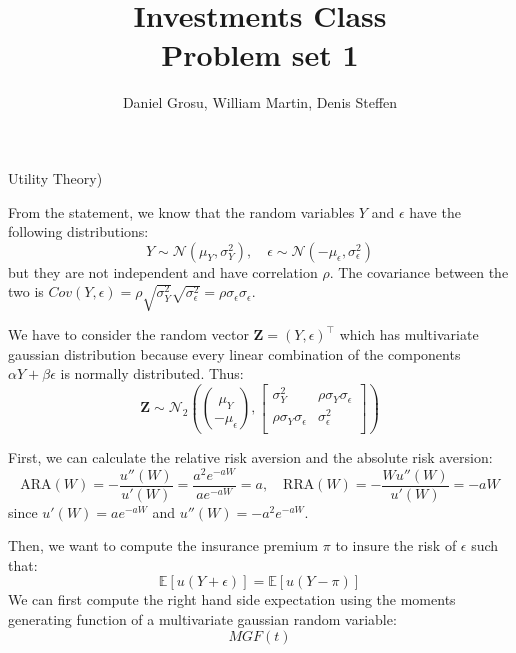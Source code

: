 \documentclass[10pt]{article}
\newcommand{\Ebb}{\mathbb{E}}
\renewcommand{\mathbf}{\mathbold}
\newenvironment{exercise}[2][Exercise]{\begin{trivlist}
  \item[\hskip \labelsep {\bfseries #1}\hskip \labelsep {\bfseries #2.}]}{\end{trivlist}}
\begin{document}
	
  \renewcommand{\qedsymbol}{\smiley}
	\title{Investments Class \\ Problem set 1}
	\author{Daniel Grosu, William Martin, Denis Steffen}
	
	\maketitle

  \begin{exercise}{1}(Utility Theory)

From the statement, we know that the random variables $Y$ and $\epsilon$ have the following distributions:
$$ Y \sim \mathcal{N}(\mu_Y,\sigma_Y^2), \quad \epsilon \sim \mathcal{N}(-\mu_\epsilon,\sigma_\epsilon^2)$$ but they are not independent and have correlation $\rho$. 
The covariance between the two is $Cov(Y,\epsilon) = \rho\sqrt{\sigma_Y^2}\sqrt{\sigma_\epsilon^2} = \rho\sigma_\epsilon\sigma_\epsilon$. 

We have to consider the random vector $\mathbf{Z} = (Y,\epsilon)^\top$ which has multivariate gaussian distribution because every linear combination of the components $\alpha Y + \beta \epsilon$ is normally distributed. Thus:
$$ \mathbf{Z} \sim \mathcal{N}_2 \left( {\mu_Y \choose -\mu_\epsilon},\begin{bmatrix}
  \sigma^2_Y&\rho\sigma_Y\sigma_\epsilon\\
  \rho\sigma_Y\sigma_\epsilon&\sigma_\epsilon^2\\
  \end{bmatrix} \right) $$

  First, we can calculate the relative risk aversion and the absolute risk aversion:
\begin{equation*}
  \text{ARA}(W) = -\frac{u''(W)}{u'(W)} = \frac{a^2e^{-aW}}{ae^{-aW}} = a, \quad \text{RRA}(W) = -\frac{Wu''(W)}{u'(W)} = -aW
\end{equation*} since $u'(W) = ae^{-aW}$ and $u''(W) = -a^2e^{-aW}$.

Then, we want to compute the insurance premium $\pi$ to insure the risk of $\epsilon$ such that: $$ \Ebb[u(Y+\epsilon)] = \Ebb[u(Y-\pi)] $$
We can first compute the right hand side expectation using the moments generating function of a multivariate gaussian random variable:
$$ MGF(t)$$
  \end{exercise}
\end{document}
